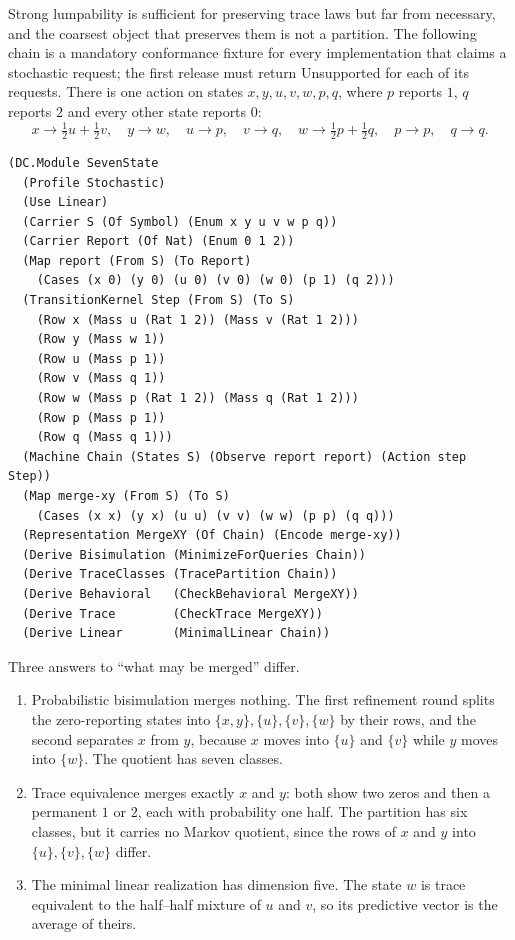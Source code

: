 \documentclass[11pt]{article}
\theoremstyle{definition}
\theoremstyle{plain}
\begin{document}
Strong lumpability is sufficient for preserving trace laws but far from necessary, and the
coarsest object that preserves them is not a partition. The following chain is a mandatory
conformance fixture for every implementation that claims a stochastic request; the first release
must return Unsupported for each of its requests. There is one action on states
$x,y,u,v,w,p,q$, where $p$ reports $1$, $q$ reports $2$ and every other state reports $0$:
\[
x\to\tfrac12u+\tfrac12v,\quad y\to w,\quad u\to p,\quad v\to q,\quad
w\to\tfrac12p+\tfrac12q,\quad p\to p,\quad q\to q .
\]
\begin{lstlisting}[basicstyle=\ttfamily\footnotesize,title={\scriptsize\ttfamily fixtures/seven\_state.metta}]
(DC.Module SevenState
  (Profile Stochastic)
  (Use Linear)
  (Carrier S (Of Symbol) (Enum x y u v w p q))
  (Carrier Report (Of Nat) (Enum 0 1 2))
  (Map report (From S) (To Report)
    (Cases (x 0) (y 0) (u 0) (v 0) (w 0) (p 1) (q 2)))
  (TransitionKernel Step (From S) (To S)
    (Row x (Mass u (Rat 1 2)) (Mass v (Rat 1 2)))
    (Row y (Mass w 1))
    (Row u (Mass p 1))
    (Row v (Mass q 1))
    (Row w (Mass p (Rat 1 2)) (Mass q (Rat 1 2)))
    (Row p (Mass p 1))
    (Row q (Mass q 1)))
  (Machine Chain (States S) (Observe report report) (Action step Step))
  (Map merge-xy (From S) (To S)
    (Cases (x x) (y x) (u u) (v v) (w w) (p p) (q q)))
  (Representation MergeXY (Of Chain) (Encode merge-xy))
  (Derive Bisimulation (MinimizeForQueries Chain))
  (Derive TraceClasses (TracePartition Chain))
  (Derive Behavioral   (CheckBehavioral MergeXY))
  (Derive Trace        (CheckTrace MergeXY))
  (Derive Linear       (MinimalLinear Chain))
\end{lstlisting}
Three answers to ``what may be merged'' differ.
\begin{enumerate}
\item Probabilistic bisimulation merges nothing. The first refinement round splits the
zero-reporting states into $\{x,y\},\{u\},\{v\},\{w\}$ by their rows, and the second separates
$x$ from $y$, because $x$ moves into $\{u\}$ and $\{v\}$ while $y$ moves into $\{w\}$. The quotient
has seven classes.
\item Trace equivalence merges exactly $x$ and $y$: both show two zeros and then a permanent $1$ or
$2$, each with probability one half. The partition has six classes, but it carries no Markov
quotient, since the rows of $x$ and $y$ into $\{u\},\{v\},\{w\}$ differ.
\item The minimal linear realization has dimension five. The state $w$ is trace equivalent to
the half--half mixture of $u$ and $v$, so its predictive vector is the average of theirs.
\end{enumerate}
\end{document}
